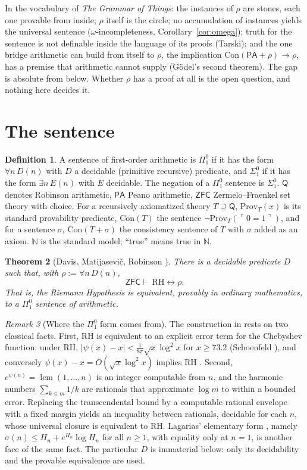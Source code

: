\documentclass[11pt]{article}
\newtheorem{theorem}{Theorem}[section]
\theoremstyle{definition}
\newtheorem{definition}[theorem]{Definition}
\theoremstyle{remark}
\newtheorem{remark}[theorem]{Remark}
\newcommand{\N}{\mathbb N}
\newcommand{\PA}{\mathsf{PA}}
\newcommand{\ZFC}{\mathsf{ZFC}}
\newcommand{\RA}{\mathsf{Q}}
\newcommand{\Prov}{\mathrm{Prov}}
\newcommand{\Con}{\mathrm{Con}}
\newcommand{\RH}{\mathrm{RH}}
\newcommand{\gn}[1]{\ulcorner #1\urcorner}
\newcommand{\Pione}{\Pi^0_1}
\newcommand{\Sigone}{\Sigma^0_1}
\DeclareMathOperator{\lcm}{lcm}
\begin{document}
In the vocabulary of \emph{The Grammar of Things}: the instances of $\rho$ are stones, each one provable from inside; $\rho$ itself is the circle; no accumulation of instances yields the universal sentence ($\omega$-incompleteness, Corollary~\ref{cor:omega}); truth for the sentence is not definable inside the language of its proofs (Tarski); and the one bridge arithmetic can build from itself to $\rho$, the implication $\Con(\PA+\rho)\to\rho$, has a premise that arithmetic cannot supply (G\"odel's second theorem). The gap is absolute from below. Whether $\rho$ has a proof at all is the open question, and nothing here decides it.

\section{The sentence}\label{sec:sentence}

\begin{definition}
A sentence of first-order arithmetic is $\Pione$ if it has the form $\forall n\,D(n)$ with $D$ a decidable (primitive recursive) predicate, and $\Sigone$ if it has the form $\exists n\,E(n)$ with $E$ decidable. The negation of a $\Pione$ sentence is $\Sigone$. $\RA$ denotes Robinson arithmetic, $\PA$ Peano arithmetic, $\ZFC$ Zermelo--Fraenkel set theory with choice. For a recursively axiomatized theory $T\supseteq\RA$, $\Prov_T(x)$ is its standard provability predicate, $\Con(T)$ the sentence $\neg\Prov_T(\gn{0=1})$, and for a sentence $\sigma$, $\Con(T+\sigma)$ the consistency sentence of $T$ with $\sigma$ added as an axiom. $\N$ is the standard model; ``true'' means true in $\N$.
\end{definition}

\begin{theorem}[Davis, Matijasevi\v{c}, Robinson \cite{DMR}]\label{thm:pi1}
There is a decidable predicate $D$ such that, with $\rho:=\forall n\,D(n)$,
\[
\ZFC\vdash\ \RH\leftrightarrow\rho .
\]
That is, the Riemann Hypothesis is equivalent, provably in ordinary mathematics, to a $\Pione$ sentence of arithmetic.
\end{theorem}

\begin{remark}[Where the $\Pione$ form comes from]\label{rem:form}
The construction in \cite{DMR} rests on two classical facts. First, $\RH$ is equivalent to an explicit error term for the Chebyshev function: under $\RH$, $|\psi(x)-x|<\frac1{8\pi}\sqrt x\log^2x$ for $x\ge73.2$ (Schoenfeld \cite{Schoenfeld}), and conversely $\psi(x)-x=O(\sqrt x\log^2x)$ implies $\RH$ \cite[\S14]{Titchmarsh}. Second, $e^{\psi(n)}=\lcm(1,\dots,n)$ is an integer computable from $n$, and the harmonic numbers $\sum_{k\le m}1/k$ are rationals that approximate $\log m$ to within a bounded error. Replacing the transcendental bound by a computable rational envelope with a fixed margin yields an inequality between rationals, decidable for each $n$, whose universal closure is equivalent to $\RH$. Lagarias' elementary form \cite{Lagarias}, namely $\sigma(n)\le H_n+e^{H_n}\log H_n$ for all $n\ge1$, with equality only at $n=1$, is another face of the same fact. The particular $D$ is immaterial below: only its decidability and the provable equivalence are used.
\end{remark}
\end{document}
